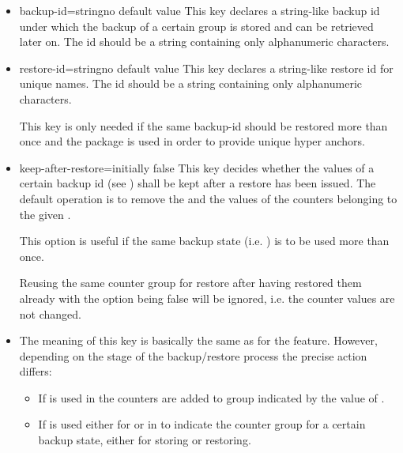 \documentclass[12pt,a4paper,oneside]{article}
\begin{document}
\begin{itemize}
\begin{docKey}[][]{cascading}{=}{initially false}
    This provides a very convenient feature to backup and restore the value of a certain sectioning level, say . Using  this would mean\footnote{Assuming  is used, for example!} that , , ,, , , ,  and  would be added to the counter group.
    \end{docKey}
  \item  \begin{docKey}[][]{backup-id}{=string}{no default value}
      This key declares a string-like backup id under which the backup of a certain group is stored and can be retrieved later on. The id should be a string containing only alphanumeric characters. 
    \end{docKey} 
\item 
  \begin{docKey}[][]{restore-id}{=string}{no default value}
    This key declares a string-like restore id for unique  names. The id should be a string containing only alphanumeric characters.     \end{docKey} 
  This key is only needed if the same backup-id should be restored more than once and the package  is used in order to provide unique hyper anchors. 
  \item \begin{docKey}[][]{keep-after-restore}{=}{initially false}
  This key decides whether the values of a certain backup id (see ) shall be kept after a restore has been issued. The default operation is to remove the  and the values of the counters belonging to the given .
  
  This option is useful if the same backup state (i.e. ) is to be used more than once. 

  Reusing the same counter group for restore after having restored them already with the  option being false will be ignored, i.e. the counter values are not changed. 
\end{docKey}

\item {} 
  The meaning of this key is basically the same as for the  feature. However, depending on the stage of the backup/restore process the precise action differs:
  \begin{itemize}
    \item If  is used in  the counters are added to group indicated by the value of .
    \item If  is used either for  or in  to indicate the counter group for a certain backup state, either for storing or restoring. 
     \end{itemize}
\end{itemize}
\end{document}
